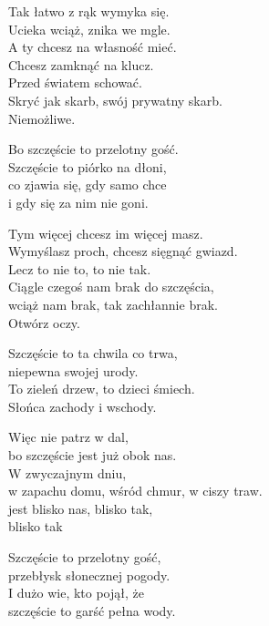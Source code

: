 \begin{text}
    Tak łatwo z rąk wymyka się.\\
    Ucieka wciąż, znika we mgle.\\
    A ty chcesz na własność mieć.\\
    Chcesz zamknąć na klucz.\\
    Przed światem schować.\\
    Skryć jak skarb, swój prywatny skarb.\\
    Niemożliwe.

    Bo szczęście to przelotny gość.\\
    Szczęście to piórko na dłoni,\\
    co zjawia się, gdy samo chce\\
    i gdy się za nim nie goni.

    Tym więcej chcesz im więcej masz.\\
    Wymyślasz proch, chcesz sięgnąć gwiazd.\\
    Lecz to nie to, to nie tak.\\
    Ciągle czegoś nam brak do szczęścia,\\
    wciąż nam brak, tak zachłannie brak.\\
    Otwórz oczy.

    Szczęście to ta chwila co trwa,\\
    niepewna swojej urody.\\
    To zieleń drzew, to dzieci śmiech.\\
    Słońca zachody i wschody.

    Więc nie patrz w dal,\\
    bo szczęście jest już obok nas.\\
    W zwyczajnym dniu,\\
    w zapachu domu, wśród chmur, w ciszy traw.\\
    jest blisko nas, blisko tak,\\
    blisko tak

    Szczęście to przelotny gość,\\
    przebłysk słonecznej pogody.\\
    I dużo wie, kto pojął, że\\
    szczęście to garść pełna wody.
\end{text}
\begin{chord}

\end{chord}